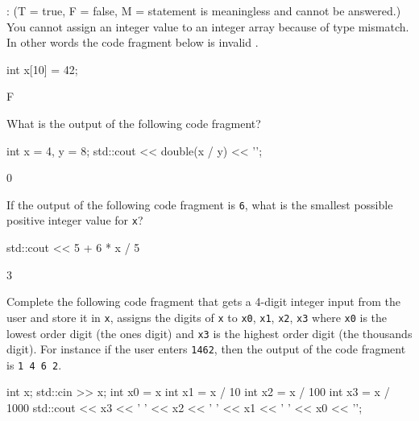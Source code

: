 \nextq
\tf:
(T = true, F = false, M = statement is meaningless and cannot be answered.)
You cannot assign an integer value to an integer array because
of type mismatch.
In other words the code fragment below is invalid \cpp.
\begin{console}[fontsize=\footnotesize]
int x[10] = 42;
\end{console}
\ANSWER
\begin{answercode}
F
\end{answercode}

\nextq
What is the output of the following code fragment?
\begin{console}[fontsize=\footnotesize]
int x = 4, y = 8;
std::cout << double(x / y) << '\n';
\end{console}
\ANSWER
\begin{answercode}
0
\end{answercode}

\nextq
If the output of the following code fragment is \verb!6!,
what is the smallest possible positive integer value for \verb!x!?
\begin{console}[fontsize=\footnotesize]
std::cout << 5 + 6 * x / 5 %
\end{console}
\ANSWER
\begin{answercode}
3
\end{answercode}

\nextq
Complete the following code fragment that gets a 4-digit integer input from the
user and store it in \verb!x!,
assigns the digits of \verb!x! to
\verb!x0!, \verb!x1!, \verb!x2!, \verb!x3!
where \verb!x0! is the lowest order digit (the ones digit)
and \verb!x3! is the highest order digit (the thousands digit).
For instance if the user enters \verb!1462!, then the output of the
code fragment is \verb!1 4 6 2!.
\\
\ANSWER
\begin{answercode}
int x;
std::cin >> x;
int x0 = x %
int x1 = x / 10 %
int x2 = x / 100 %
int x3 = x / 1000 %
std::cout << x3 << ' ' << x2 << ' ' << x1 << ' ' << x0 << '\n';
\end{answercode}


